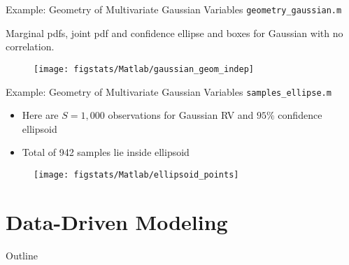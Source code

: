 \documentclass[handout,9pt]{beamer}
\begin{document}
%
\begin{frame}{Example: Geometry of Multivariate Gaussian Variables \footnotesize{\texttt{geometry\_gaussian.m}}}

Marginal pdfs, joint pdf and confidence ellipse and boxes for Gaussian with no correlation. 
\begin{figure}[!htb]
    \centering
	\texttt{[image: figstats/Matlab/gaussian\_geom\_indep]}
\end{figure}

\end{frame}

%
\begin{frame}{Example: Geometry of Multivariate Gaussian Variables \footnotesize{\texttt{samples\_ellipse.m}}}

\begin{itemize}
\setlength{\itemsep}{5pt}
\item Here are $S=1,000$ observations for Gaussian RV and $95\%$ confidence ellipsoid
\item Total of 942 samples lie inside ellipsoid 
\end{itemize}
\begin{figure}[!htb]
    \centering
	\texttt{[image: figstats/Matlab/ellipsoid\_points]}
\end{figure}

\end{frame}

\section{Data-Driven Modeling}
\begin{frame}{Outline}
\tableofcontents[currentsection]
\end{frame}
\end{document}

